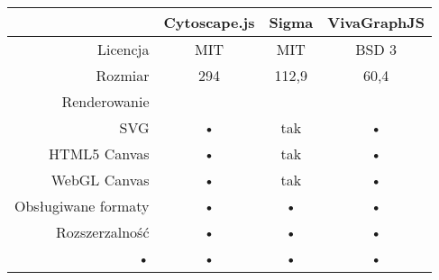 \begin{table}[H]
\begin{tabularx}{\textwidth}{|r|c|c|c}
\hline 
 & Cytoscape.js & Sigma & VivaGraphJS \\ 
\hline 
Licencja & MIT & MIT & BSD 3 \\ 
\hline 
Rozmiar & 294 & 112,9 & 60,4 \\ 
\hline 
Renderowanie & & & \\
SVG & • & tak & • \\
HTML5 Canvas & • & tak & • \\
WebGL Canvas & • & tak & • \\ 
\hline 
Obsługiwane formaty & • & • & • \\ 
\hline
Rozszerzalność & • & • & • \\ 
\hline 
• & • & • & • \\ 
\hline 
\end{tabularx} 
\end{table}


